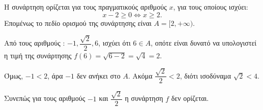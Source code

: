 
\begin{alist}
\item Η συνάρτηση ορίζεται για τους πραγματικούς αριθμούς $x$, για τους οποίους ισχύει:
\[x - 2 \ge 0 \Leftrightarrow x \ge 2.\]
Επομένως το πεδίο ορισμού της συνάρτησης είναι $A = [2, +\infty)$.

\item Από τους αριθμούς : $-1, \dfrac{\sqrt{2}}{2} , 6$, ισχύει ότι $6 \in A$, οπότε είναι δυνατό να υπολογιστεί η τιμή της συνάρτησης
$f(6) = \sqrt{6 - 2} = \sqrt{4} = 2$.

Όμως, $-1 < 2$, άρα $-1$ δεν ανήκει στο $A$.
Ακόμα $\dfrac{\sqrt{2}}{2} < 2$, διότι ισοδύναμα $\sqrt{2} < 4$.

Συνεπώς για τους αριθμούς $-1$ και $\dfrac{\sqrt{2}}{2}$ η συνάρτηση $f$ δεν ορίζεται.
\end{alist}

